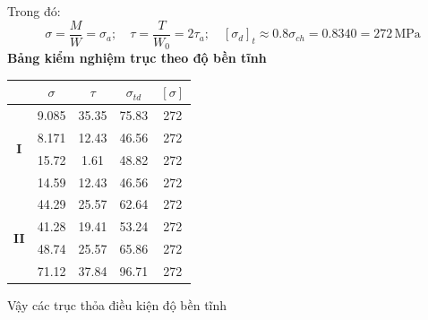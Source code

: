 Trong đó:
\[
\sigma = \frac{M}{W} = \sigma_a; \quad \tau = \frac{T}{W_0} = 2\tau_a; \quad [\sigma_d]_t \approx 0.8\sigma_{ch} = 0.8340 = 272 \, \text{MPa}
\]
\textbf{Bảng kiểm nghiệm trục theo độ bền tĩnh}
\begin{center}
\begin{tabular}{|c|c|c|c|c|}
    \hline
      & $\sigma$ & $\tau$ & $\sigma_{td}$ & $[\sigma]$ \\
    \hline
    \multirow{4}{*}{\textbf{I}} &9.085 & 35.35 & 75.83 & 272 \\
    \cline{2-5}
     & 8.171 & 12.43 & 46.56 & 272 \\
     \cline{2-5}
     & 15.72 & 1.61 & 48.82 & 272 \\
     \cline{2-5}
     & 14.59 & 12.43 & 46.56 & 272 \\
     \hline
     \multirow{4}{*}{\textbf{II}} & 44.29 & 25.57 & 62.64 & 272 \\
     \cline{2-5}
      & 41.28 & 19.41 & 53.24 & 272 \\
      \cline{2-5}
      & 48.74 & 25.57 & 65.86 & 272 \\
      \cline{2-5}
      & 71.12 & 37.84 & 96.71 & 272 \\
      \hline
\end{tabular}
\end{center}
Vậy các trục thỏa điều kiện độ bền tĩnh